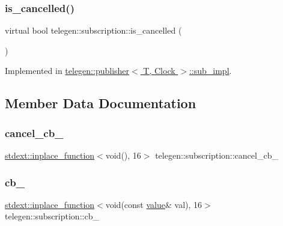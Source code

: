 \mbox{\label{classtelegen_1_1subscription_a4bbe4edbb2ecba3ccff4d6de562e2e7d}} 
\subsubsection{\texorpdfstring{is\+\_\+cancelled()}{is\_cancelled()}}
{\footnotesize\ttfamily virtual bool telegen\+::subscription\+::is\+\_\+cancelled (\begin{DoxyParamCaption}{ }\end{DoxyParamCaption})\hspace{0.3cm}{\ttfamily [pure virtual]}}



Implemented in \hyperlink{classtelegen_1_1publisher_1_1sub__impl_a9880e80ac0b1887b5aec423abbc0a6f3}{telegen\+::publisher$<$ T, Clock $>$\+::sub\+\_\+impl}.



\subsection{Member Data Documentation}
\mbox{\label{classtelegen_1_1subscription_aea82d071d3075d6b3ae8b36bf05f2d0e}} 
\subsubsection{\texorpdfstring{cancel\+\_\+cb\+\_\+}{cancel\_cb\_}}
{\footnotesize\ttfamily \hyperlink{classstdext_1_1inplace__function}{stdext\+::inplace\+\_\+function}$<$void(), 16$>$ telegen\+::subscription\+::cancel\+\_\+cb\+\_\+\hspace{0.3cm}{\ttfamily [protected]}}

\mbox{\label{classtelegen_1_1subscription_a63b2db928cfeebed477b61b58b9a6446}} 
\subsubsection{\texorpdfstring{cb\+\_\+}{cb\_}}
{\footnotesize\ttfamily \hyperlink{classstdext_1_1inplace__function}{stdext\+::inplace\+\_\+function}$<$void(const \hyperlink{classtelegen_1_1value}{value}\& val), 16$>$ telegen\+::subscription\+::cb\+\_\+\hspace{0.3cm}{\ttfamily [protected]}}

